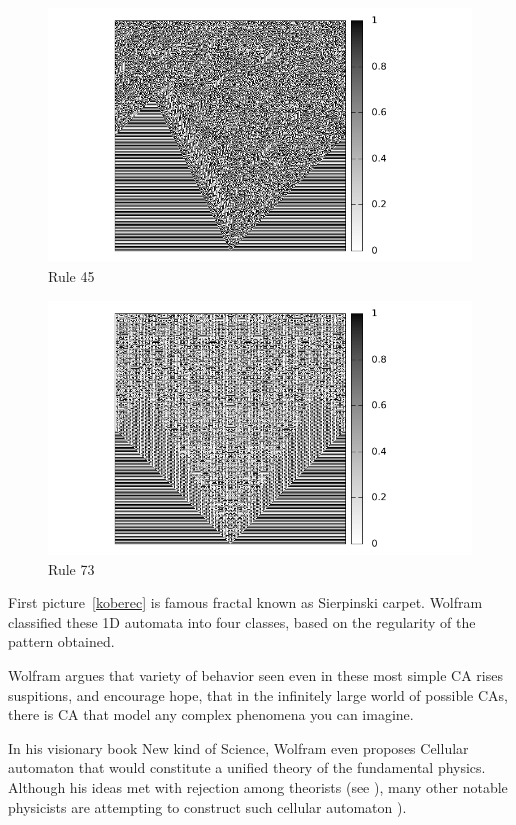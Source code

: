 \begin{figure}
 \centering
 \includegraphics[width=1\textwidth]{./img/rule45}
 \caption{Rule 45}
\end{figure}

\begin{figure}
 \centering
 \includegraphics[width=1\textwidth]{./img/rule73}
 \caption{Rule 73}
\end{figure}

First picture~\ref{koberec} is famous fractal known as Sierpinski carpet. Wolfram classified these 1D automata into four classes, based on the regularity of the pattern obtained.

Wolfram argues that variety of behavior seen even in these most simple CA rises suspitions, and encourage hope, that in the infinitely large world of possible CAs, there is CA that model any complex phenomena you can imagine.

In his visionary book New kind of Science, Wolfram even proposes Cellular automaton that would constitute a unified theory of the fundamental physics.
Although his ideas met with rejection among theorists (see \cite{aaronson}),
many other notable physicists are attempting to construct such cellular automaton \cite{hooft}).

